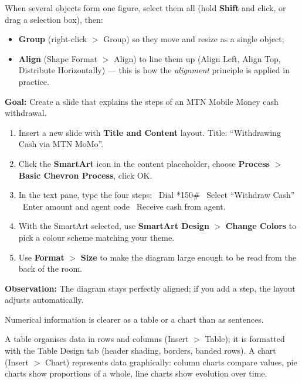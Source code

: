 \documentclass[11pt]{article}
\newcommand{\cle}[1]{{\popxbold\color{popdark}#1}}
\newcounter{popsec}
\newcounter{popsub}
\newcommand{\courssub}[1]{%
  \stepcounter{popsub}%
  \par\vspace{9pt}\noindent{\popxbold\fontsize{11.5}{13}\selectfont\color{popink}{\color{poporange}\thepopsec.\thepopsub}\hspace{6pt}#1}\par\nopagebreak\vspace{4pt}
}
\begin{document}
When several objects form one figure, select them all (hold \textbf{Shift} and click, or drag a selection box), then:
\begin{itemize}
\item \textbf{Group} (right-click $>$ Group) so they move and resize as a single object;
\item \textbf{Align} (Shape Format $>$ Align) to line them up (Align Left, Align Top, Distribute Horizontally) --- this is how the \emph{alignment} principle is applied in practice.
\end{itemize}

\begin{experience}
\textbf{Goal:} Create a slide that explains the steps of an MTN Mobile Money cash withdrawal.
\begin{enumerate}
\item Insert a new slide with \textbf{Title and Content} layout. Title: ``Withdrawing Cash via MTN MoMo''.
\item Click the \textbf{SmartArt} icon in the content placeholder, choose \textbf{Process} $>$ \textbf{Basic Chevron Process}, click OK.
\item In the text pane, type the four steps: \textbullet\ Dial *150\# \textbullet\ Select ``Withdraw Cash'' \textbullet\ Enter amount and agent code \textbullet\ Receive cash from agent.
\item With the SmartArt selected, use \textbf{SmartArt Design} $>$ \textbf{Change Colors} to pick a colour scheme matching your theme.
\item Use \textbf{Format} $>$ \textbf{Size} to make the diagram large enough to be read from the back of the room.
\end{enumerate}
\textbf{Observation:} The diagram stays perfectly aligned; if you add a step, the layout adjusts automatically.
\end{experience}

\courssub{Tables and Charts on a Slide}

Numerical information is clearer as a table or a chart than as sentences.

\begin{definition}
A \cle{table} organises data in rows and columns (Insert $>$ Table); it is formatted with the Table Design tab (header shading, borders, banded rows). A \cle{chart} (Insert $>$ Chart) represents data graphically: column charts compare values, pie charts show proportions of a whole, line charts show evolution over time.
\end{definition}
\end{document}
